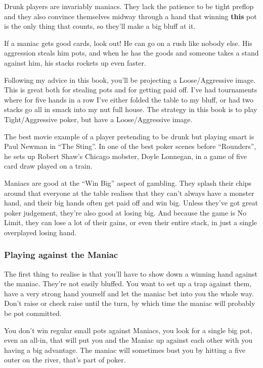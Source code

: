 Drunk players are invariably maniacs. They lack the patience to be
tight preflop and they also convince themselves midway through a
hand that winning \textbf{this} pot is the only thing that counts, so
they'll make a big bluff at it.

If a maniac gets good cards, look out! He can go on a rush like
nobody else. His aggression steals him pots, and when
he has the goods and someone takes a stand against him, his
stacks rockets up even faster.

Following my advice in this book, you'll be projecting a Loose/Aggressive
image. This is great both for stealing pots and for getting paid off.
I've had tournaments where for five hands in a row I've either folded
the table to my bluff, or had two stacks go all in smack into my nut
full house. The strategy in this book is to play Tight/Aggressive
poker, but have a Loose/Aggressive image.

The best movie example of a player pretending to be drunk but playing
smart is Paul Newman in ``The Sting''. In one of the best poker scenes
before ``Rounders'', he sets up Robert Shaw's Chicago mobster,
Doyle Lonnegan, in a game of five card draw played on a train.

Maniacs are good at the ``Win Big'' aspect of gambling. They splash
their chips around that everyone at the table realises that they
can't always have a monster hand, and their big hands often get
paid off and win big. Unless they've got great poker judgement, they're
also good at losing big. And because the game is No Limit, they can
lose a lot of their gains, or even their entire stack, in just a
single overplayed losing hand.

\subsubsection{Playing against the Maniac}

The first thing to realise is that you'll have to show down a winning
hand against the maniac. They're not easily bluffed. You want to set up a
trap against them, have a very strong hand yourself and let the maniac
bet into you the whole way. Don't raise or check raise until
the turn, by which time the maniac will probably be pot committed.

You don't win regular small pots against Maniacs, you look for a single big
pot, even an all-in, that will put you and the Maniac up against each
other with you having a big advantage. The maniac will sometimes bust
you by hitting a five outer on the river, that's part of poker.

